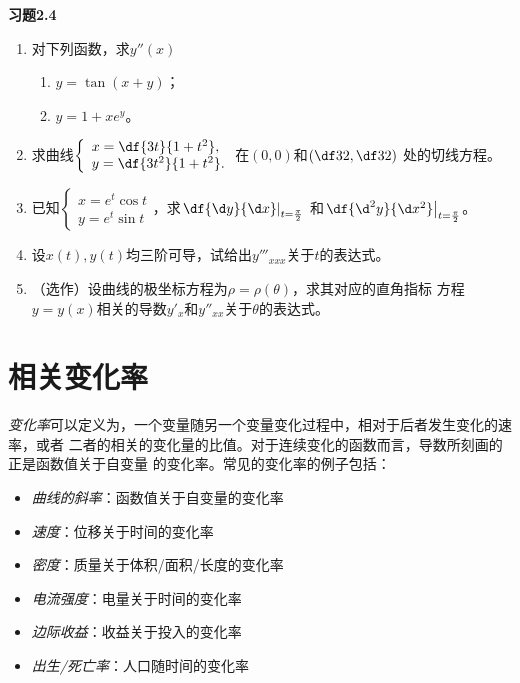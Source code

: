 \begin{ext}
	{\centering\bf 习题2.4}
	
	\begin{enumerate}  
	  \item 对下列函数，求$y''(x)$
	  \begin{enumerate}[(1)]
	    \item $y=\tan(x+y)$；
	    \item $y=1+xe^y$。
	  \end{enumerate}
	  \item 求曲线$\left\{\begin{array}{l}
	  	x=\df{3t}{1+t^2},\\ y=\df{3t^2}{1+t^2}.
	  \end{array}\right.$在$(0,0)$和$\left(\df32,\df32\right)$
	  处的切线方程。
	  \item 已知$\left\{\begin{array}{l}
	  	x=e^t\cos t\\ y=e^t\sin t
	  \end{array}\right.$，求$\left.\df{\d y}{\d x}\right|_{t=\frac{\pi}2}$
	  和$\left.\df{\d^2 y}{\d x^2}\right|_{t=\frac{\pi}2}$。
	  \item 设$x(t),y(t)$均三阶可导，试给出$y'''_{xxx}$关于$t$的表达式。
	  \item （选作）设曲线的极坐标方程为$\rho=\rho(\theta)$，求其对应的直角指标
	  方程$y=y(x)$相关的导数$y'_x$和$y''_{xx}$关于$\theta$的表达式。
	\end{enumerate}
\end{ext}

\section{相关变化率}

{\it 变化率}可以定义为，一个变量随另一个变量变化过程中，相对于后者发生变化的速率，或者
二者的相关的变化量的比值。对于连续变化的函数而言，导数所刻画的正是函数值关于自变量
的变化率。常见的变化率的例子包括：

\begin{itemize}
  \setlength{\itemindent}{2em}
  \item {\it 曲线的斜率}：函数值关于自变量的变化率 
  \item {\it 速度}：位移关于时间的变化率 
  \item {\it 密度}：质量关于体积/面积/长度的变化率 
  \item {\it 电流强度}：电量关于时间的变化率 
  \item {\it 边际收益}：收益关于投入的变化率 
  \item {\it 出生/死亡率}：人口随时间的变化率
\end{itemize}

